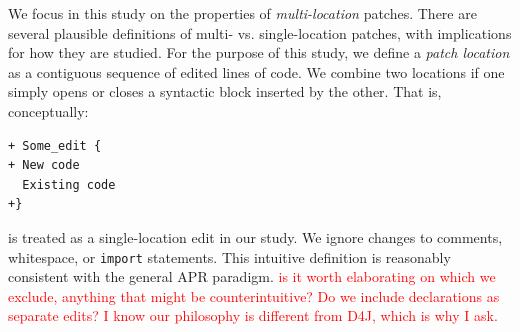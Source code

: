 \documentclass[10pt, conference]{IEEEtran}
\newcommand\todo[1]{\textcolor{red}{#1}}
\begin{document}
We focus in this study on the properties of \emph{multi-location} patches. There are
several plausible definitions of multi- vs. single-location patches, with
implications for how they are studied. For the purpose of this study, we define
a \emph{patch location} as a contiguous sequence of edited lines of code.  We
combine two locations if one simply opens or closes a syntactic block inserted
by the other. That is, conceptually:
\begin{lstlisting}
+ Some_edit {
+ New code
  Existing code
+}
\end{lstlisting}
is treated as a single-location edit in our study. We ignore changes to
comments, whitespace, or \texttt{import} statements.
%
This intuitive definition is reasonably consistent with the general APR
paradigm. 
\todo{is it worth elaborating on which we exclude, anything that might be
  counterintuitive? Do we include declarations as separate edits? I know our
  philosophy is different from D4J, which is why I ask.}
\end{document}
